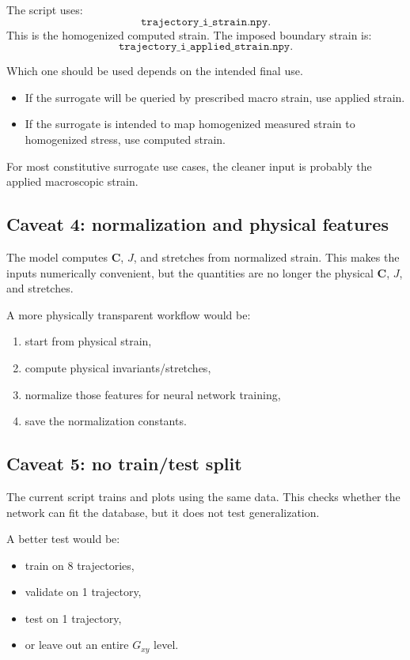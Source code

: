 \documentclass[11pt]{article}
\newcommand{\C}{\bm{C}}
\begin{document}
The script uses:
\[
  \texttt{trajectory\_i\_strain.npy}.
\]
This is the homogenized computed strain. The imposed boundary strain is:
\[
  \texttt{trajectory\_i\_applied\_strain.npy}.
\]

Which one should be used depends on the intended final use.

\begin{itemize}[leftmargin=2em]
  \item If the surrogate will be queried by prescribed macro strain, use applied
        strain.
  \item If the surrogate is intended to map homogenized measured strain to
        homogenized stress, use computed strain.
\end{itemize}

For most constitutive surrogate use cases, the cleaner input is probably the
applied macroscopic strain.

\subsection{Caveat 4: normalization and physical features}

The model computes $\C$, $J$, and stretches from normalized strain. This makes
the inputs numerically convenient, but the quantities are no longer the physical
$\C$, $J$, and stretches.

A more physically transparent workflow would be:

\begin{enumerate}[leftmargin=2em]
  \item start from physical strain,
  \item compute physical invariants/stretches,
  \item normalize those features for neural network training,
  \item save the normalization constants.
\end{enumerate}

\subsection{Caveat 5: no train/test split}

The current script trains and plots using the same data. This checks whether the
network can fit the database, but it does not test generalization.

A better test would be:

\begin{itemize}[leftmargin=2em]
  \item train on 8 trajectories,
  \item validate on 1 trajectory,
  \item test on 1 trajectory,
  \item or leave out an entire $G_{xy}$ level.
\end{itemize}
\end{document}
